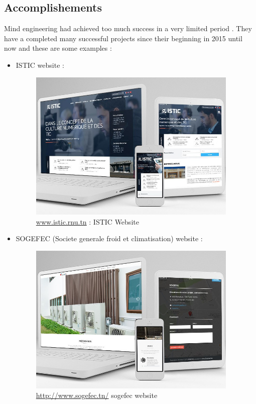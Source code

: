 \subsection{Accomplishements}
Mind engineering had achieved too much success in a very limited period . They have a completed many successful projects since their beginning in 2015 until now  and 
these are some examples : 
\begin{itemize}
\item ISTIC website : 
\begin{figure}[H]
	\includegraphics[width=10cm]{istic.jpg}
		\caption{\href{http://www.istic.rnu.tn/}{www.istic.rnu.tn} : ISTIC Website}
	\label{istic website}
\end{figure}



\item SOGEFEC (Societe generale froid et climatisation) website : 
\begin{figure}[H]
	\includegraphics[width=10cm]{sogefec.jpg}
	\caption{\href{http://www.sogefec.tn/}{http://www.sogefec.tn/}  sogefec website}
	\label{istic website}
\end{figure}


\end{itemize}

